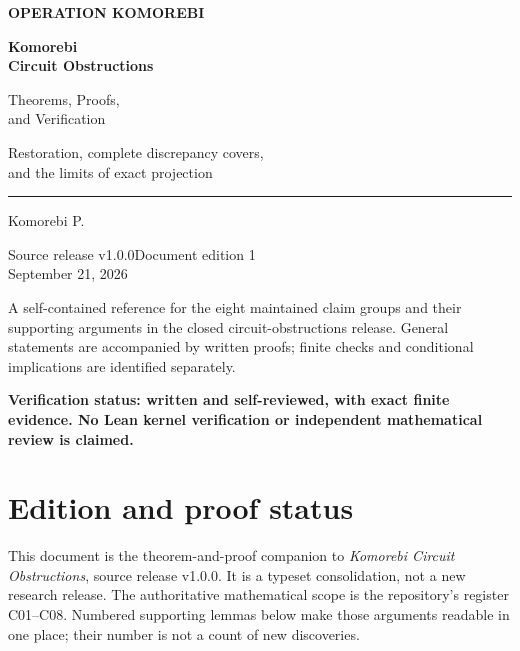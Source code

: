\documentclass[11pt,letterpaper,oneside]{report}
\theoremstyle{komorebi}
\begin{document}
\begin{titlepage}
\thispagestyle{empty}
{\sffamily\small\bfseries\color{accent}OPERATION KOMOREBI\par}
\vspace{1.02in}
{\sffamily\bfseries\color{ink}\fontsize{32}{36}\selectfont Komorebi\\[3pt]Circuit Obstructions\par}
\vspace{0.28in}
{\sffamily\fontsize{21}{26}\selectfont Theorems, Proofs,\\and Verification\par}
\vspace{0.26in}
{\large\color{muted}Restoration, complete discrepancy covers,\\and the limits of exact projection\par}
\vspace{0.55in}
{\color{accent}\rule{0.65\textwidth}{1.3pt}\par}
\vspace{0.23in}
{\large Komorebi P.\par}
\vspace{0.1in}
{\sffamily\small Source release v1.0.0\quad\textbullet\quad Document edition 1\\September 21, 2026\par}
\vfill
\begin{minipage}{0.94\textwidth}
\small
A self-contained reference for the eight maintained claim groups and their supporting arguments in the closed circuit-obstructions release. General statements are accompanied by written proofs; finite checks and conditional implications are identified separately.

\textbf{Verification status: written and self-reviewed, with exact finite evidence. No Lean kernel verification or independent mathematical review is claimed.}
\end{minipage}
\end{titlepage}
\chapter*{Edition and proof status}
This document is the theorem-and-proof companion to \emph{Komorebi Circuit Obstructions}, source release v1.0.0. It is a typeset consolidation, not a new research release. The authoritative mathematical scope is the repository's register C01--C08. Numbered supporting lemmas below make those arguments readable in one place; their number is not a count of new discoveries.
\end{document}
